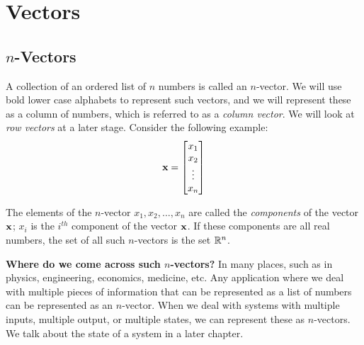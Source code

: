 \chapter{Vectors}\label{chp:vectors}


\section{$n$-Vectors}
A collection of an ordered list of $n$ numbers is called an $n$-vector. We will use bold lower case alphabets to represent such vectors, and we will represent these as a column of numbers, which is referred to as a \textit{column vector}. We will look at \textit{row vectors} at a later stage. Consider the following example:
\[ \mf{x} = \bmxc x_1 \\ x_2 \\ \vdots \\x_n \emx \]

The elements of the $n$-vector $x_1, x_2, \ldots, x_n$ are called the \textit{components} of the vector $\mathbf{x}$; $x_i$ is the $i^{th}$ component of the vector $\mathbf{x}$. If these components are all real numbers, the set of all such $n$-vectors is the set $\mathbb{R}^n$.

\noindent \textbf{Where do we come across such $n$-vectors?} In many places, such as in physics, engineering, economics, medicine, etc. Any application where we deal with multiple pieces of information that can be represented as a list of numbers can be represented as an $n$-vector. When we deal with systems with multiple inputs, multiple output, or multiple states, we can represent these as $n$-vectors. We talk about the state of a system in a later chapter.

